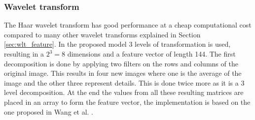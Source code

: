 \subsubsection{Wavelet transform}
\label{sec:meth:featextr:wt}
The Haar wavelet transform has good performance at a cheap computational cost compared to many other wavelet transforms explained in Section \ref{sec:wlt_feature}. In the proposed model 3 levels of transformation is used, resulting in a $2^3 = 8$ dimensions and a feature vector of length 144. The first decomposition is done by applying two filters on the rows and columns of the original image. This results in four new images where one is the average of the image and the other three represent details. This is done twice more as it is a 3 level decomposition. At the end the values from all these resulting matrices are placed in an array to form the feature vector, the implementation is based on the one proposed in Wang et al. \cite{wang2015new}.

